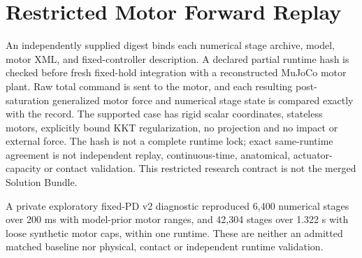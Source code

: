 \documentclass{article}
\begin{document}
\section{Restricted Motor Forward Replay}
An independently supplied digest binds each numerical stage archive, model,
motor XML, and fixed-controller description. A declared partial runtime hash
is checked before fresh fixed-hold integration with a reconstructed MuJoCo
motor plant. Raw total command is sent to the motor, and each resulting
post-saturation generalized motor force and numerical stage state is compared
exactly with the record. The supported case has rigid scalar coordinates,
stateless motors, explicitly bound KKT regularization, no projection and no impact or external force. The hash is
not a complete runtime lock; exact same-runtime agreement is not independent
replay, continuous-time, anatomical, actuator-capacity or contact validation.
This restricted research contract is not the merged Solution Bundle.

A private exploratory fixed-PD v2 diagnostic reproduced 6,400 numerical
 stages over 200 ms with model-prior motor ranges, and 42,304 stages over
 1.322 s with loose synthetic motor caps, within one runtime. These are
 neither an admitted matched baseline nor physical, contact or independent
 runtime validation.
\end{document}
